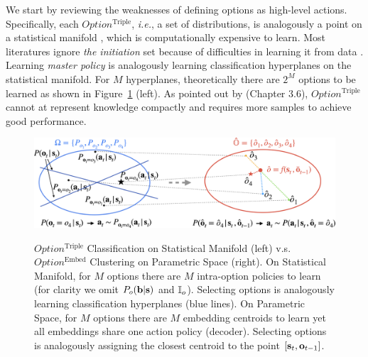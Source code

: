 \documentclass{article}
\begin{document}
We start by reviewing the weaknesses of defining options as high-level actions. Specifically, each $Option^{\textrm{Triple}}$, \textit{i.e.}, a
set of distributions, is analogously a point on a statistical
manifold \cite{amari1987differential}, which is 
computationally expensive to learn. Most literatures ignore
\emph{the initiation} set because of difficulties in learning it
from data \cite{khetarpal2020options}. Learning \emph{master
  policy} is analogously learning classification hyperplanes
\cite{mankowitz2016adaptive} on the statistical manifold. For $M$
hyperplanes, theoretically there are $2^M$ options to be learned as shown in Figure~\ref{fig:o2v_manifold} (left). As pointed out by  (Chapter
3.6), $Option^{\textrm{Triple}}$ cannot at represent knowledge compactly and requires more samples to achieve good performance.
\begin{figure}[h!]
  \vspace{-3mm} \centering
  \includegraphics[width=0.9\linewidth]{figures/O2V_Manifold.png}\\
  \vspace{-1mm} \centering
  \caption{\label{fig:o2v_manifold} \small
    $Option^{\textrm{Triple}}$ Classification on Statistical
      Manifold (left) v.s. $Option^{\textrm{Embed}}$ Clustering on
    Parametric Space (right). On Statistical Manifold, for $M$
    options there are $M$ intra-option policies to learn
    (for clarity we omit $P_o({\mathbf{b}}|{\mathbf{s}})$ and ${\mathbb{I}}_o$). Selecting
    options is analogously learning classification 
      hyperplanes (blue lines). On Parametric Space, for $M$
    options there are $M$ embedding centroids to learn yet
    all embeddings share one action policy (decoder).
    Selecting options is analogously assigning the closest
      centroid to the point $[{\mathbf{s}}_t,{\mathbf{o}}_{t-1}]$.}
  \vspace{-5mm}
\end{figure}
\end{document}

